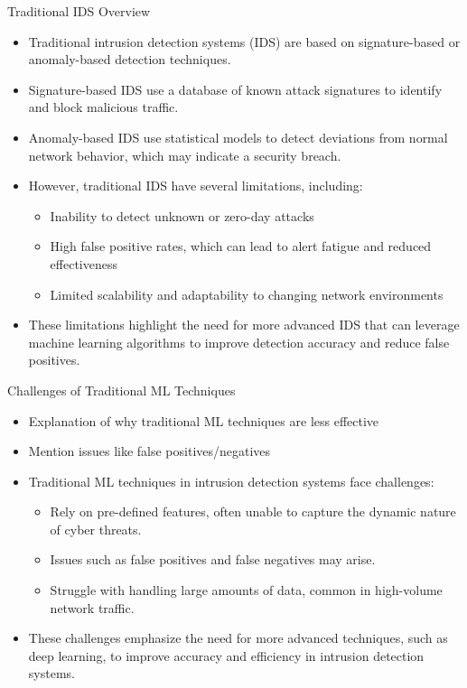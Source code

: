 \documentclass{beamer}
\begin{document}
\begin{frame}{Traditional IDS Overview}
  \begin{itemize}
    \item Traditional intrusion detection systems (IDS) are based on signature-based or anomaly-based detection techniques.
    \item Signature-based IDS use a database of known attack signatures to identify and block malicious traffic.
    \item Anomaly-based IDS use statistical models to detect deviations from normal network behavior, which may indicate a security breach.
    \item However, traditional IDS have several limitations, including:
      \begin{itemize}
        \item Inability to detect unknown or zero-day attacks
        \item High false positive rates, which can lead to alert fatigue and reduced effectiveness
        \item Limited scalability and adaptability to changing network environments
      \end{itemize}
    \item These limitations highlight the need for more advanced IDS that can leverage machine learning algorithms to improve detection accuracy and reduce false positives.
  \end{itemize}
\end{frame}


\begin{frame}{Challenges of Traditional ML Techniques}
  \begin{itemize}
    \item Explanation of why traditional ML techniques are less effective
    \item Mention issues like false positives/negatives

    \vspace{1em}

    \item Traditional ML techniques in intrusion detection systems face challenges:
      \begin{itemize}
        \item Rely on pre-defined features, often unable to capture the dynamic nature of cyber threats.
        \item Issues such as false positives and false negatives may arise.
        \item Struggle with handling large amounts of data, common in high-volume network traffic.
      \end{itemize}
    \item These challenges emphasize the need for more advanced techniques, such as deep learning, to improve accuracy and efficiency in intrusion detection systems.
  \end{itemize}
\end{frame}
\end{document}
